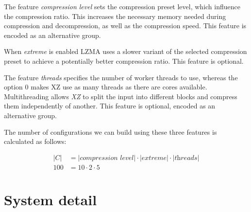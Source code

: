 The feature \emph{compression level} sets the compression preset level, which influence the compression ratio.
This increases the necessary memory needed during compression and decompression, as well as the compression speed. 
This feature is encoded as an alternative group.

When \emph{extreme} is enabled \textsc{LZMA} uses a slower variant of the selected compression preset to achieve a potentially better compression ratio.
This feature is optional.

The feature \emph{threads} specifies the number of worker threads to use, whereas the option $0$ makes \textsc{XZ}  use as many threads as there are cores available.
Multithreading allows \emph{XZ} to split the input into different blocks and compress them independently of another.
This feature is optional, encoded as an alternative group.


The number of configurations we can build using these three features is calculated as follows:

\begin{align}
    \lvert C \rvert &= \lvert \textit{compression level} \rvert \cdot \lvert \textit{extreme} \rvert \cdot \lvert \textit{threads} \rvert \\
    100 &= 10 \cdot 2 \cdot 5 \nonumber
\end{align}


\section{System detail}\label{ch:system-detail}